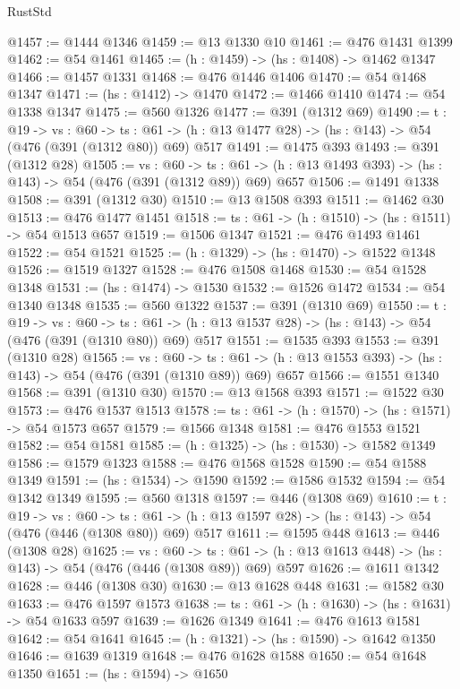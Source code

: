 \begin{lexlean}{RustStd}
\begin{coremodule}
{\begin{coremodule}
{{{{{{{{{{{{{{{{{{{{{{{{{{{{{{{{{{{{{{@1457 := @1444 @1346
@1459 := @13 @1330 @10
@1461 := @476 @1431 @1399
@1462 := @54 @1461
@1465 := (h : @1459) -> (hs : @1408) -> @1462 @1347
@1466 := @1457 @1331
@1468 := @476 @1446 @1406
@1470 := @54 @1468 @1347
@1471 := (hs : @1412) -> @1470
@1472 := @1466 @1410
@1474 := @54 @1338 @1347
@1475 := @560 @1326
@1477 := @391 (@1312 @69)
@1490 := {t : @19} ->
  {vs : @60} ->
  {ts : @61} -> (h : @13 @1477 @28) -> (hs : @143) -> @54 (@476 (@391 (@1312 @80)) @69) @517
@1491 := @1475 @393
@1493 := @391 (@1312 @28)
@1505 := {vs : @60} ->
  {ts : @61} -> (h : @13 @1493 @393) -> (hs : @143) -> @54 (@476 (@391 (@1312 @89)) @69) @657
@1506 := @1491 @1338
@1508 := @391 (@1312 @30)
@1510 := @13 @1508 @393
@1511 := @1462 @30
@1513 := @476 @1477 @1451
@1518 := {ts : @61} -> (h : @1510) -> (hs : @1511) -> @54 @1513 @657
@1519 := @1506 @1347
@1521 := @476 @1493 @1461
@1522 := @54 @1521
@1525 := (h : @1329) -> (hs : @1470) -> @1522 @1348
@1526 := @1519 @1327
@1528 := @476 @1508 @1468
@1530 := @54 @1528 @1348
@1531 := (hs : @1474) -> @1530
@1532 := @1526 @1472
@1534 := @54 @1340 @1348
@1535 := @560 @1322
@1537 := @391 (@1310 @69)
@1550 := {t : @19} ->
  {vs : @60} ->
  {ts : @61} -> (h : @13 @1537 @28) -> (hs : @143) -> @54 (@476 (@391 (@1310 @80)) @69) @517
@1551 := @1535 @393
@1553 := @391 (@1310 @28)
@1565 := {vs : @60} ->
  {ts : @61} -> (h : @13 @1553 @393) -> (hs : @143) -> @54 (@476 (@391 (@1310 @89)) @69) @657
@1566 := @1551 @1340
@1568 := @391 (@1310 @30)
@1570 := @13 @1568 @393
@1571 := @1522 @30
@1573 := @476 @1537 @1513
@1578 := {ts : @61} -> (h : @1570) -> (hs : @1571) -> @54 @1573 @657
@1579 := @1566 @1348
@1581 := @476 @1553 @1521
@1582 := @54 @1581
@1585 := (h : @1325) -> (hs : @1530) -> @1582 @1349
@1586 := @1579 @1323
@1588 := @476 @1568 @1528
@1590 := @54 @1588 @1349
@1591 := (hs : @1534) -> @1590
@1592 := @1586 @1532
@1594 := @54 @1342 @1349
@1595 := @560 @1318
@1597 := @446 (@1308 @69)
@1610 := {t : @19} ->
  {vs : @60} ->
  {ts : @61} -> (h : @13 @1597 @28) -> (hs : @143) -> @54 (@476 (@446 (@1308 @80)) @69) @517
@1611 := @1595 @448
@1613 := @446 (@1308 @28)
@1625 := {vs : @60} ->
  {ts : @61} -> (h : @13 @1613 @448) -> (hs : @143) -> @54 (@476 (@446 (@1308 @89)) @69) @597
@1626 := @1611 @1342
@1628 := @446 (@1308 @30)
@1630 := @13 @1628 @448
@1631 := @1582 @30
@1633 := @476 @1597 @1573
@1638 := {ts : @61} -> (h : @1630) -> (hs : @1631) -> @54 @1633 @597
@1639 := @1626 @1349
@1641 := @476 @1613 @1581
@1642 := @54 @1641
@1645 := (h : @1321) -> (hs : @1590) -> @1642 @1350
@1646 := @1639 @1319
@1648 := @476 @1628 @1588
@1650 := @54 @1648 @1350
@1651 := (hs : @1594) -> @1650
}}}}}}}}}}}}}}}}}}}}}}}}}}}}}}}}}}}}}}
\end{coremodule}}
\end{coremodule}
\end{lexlean}
